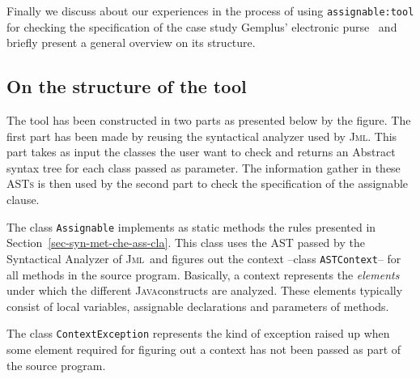 \documentclass[a4paper]{llncs}
\newcommand{\jml}{\textsc{Jml}}
\newcommand{\escj}{\textsc{Esc/Java}}
\newcommand{\java}{\textsc{Java}}
\newcommand{\modtool}{\texttt{assignable:tool}}
\newcommand{\fieldsof}{\texttt{\(\backslash\)fields\_of}}
\newcommand{\reach}{\texttt{\(\backslash\)reach}}
\begin{document}
Finally we discuss about our experiences in the process of using \modtool
for checking the specification of the case study Gemplus' electronic
purse~\cite{CatanoH02a} and briefly present a general overview on its
structure.




\subsection{On the structure of the tool}
\label{sub-on-the-str-too}
The tool has been constructed in two parts as presented below by the
figure. The first part has been made by reusing the
syntactical analyzer used by \jml. This part takes as input the
classes the user want to check and returns an Abstract syntax tree for 
each class passed as parameter. The information gather in these
\textsc{ASTs} is then used by the second part to check the
specification of the assignable clause.

The class \texttt{Assignable} implements as static methods the rules
presented in Section~\ref{sec-syn-met-che-ass-cla}. This class uses the 
\textsc{AST} passed by the Syntactical Analyzer of \jml~and figures
out the context --class \texttt{ASTContext}-- for all methods in the
source program. Basically, a context represents the \textit{elements} 
under which the different \java constructs are analyzed. These
elements typically consist of local variables, assignable declarations
and parameters of methods.

\begin{figure}[hbt]
\centering
{}
\end{figure}

The class \texttt{ContextException} represents the kind of exception
raised up when some element required for figuring out a context has
not been passed as part of the source program. 
\end{document}
